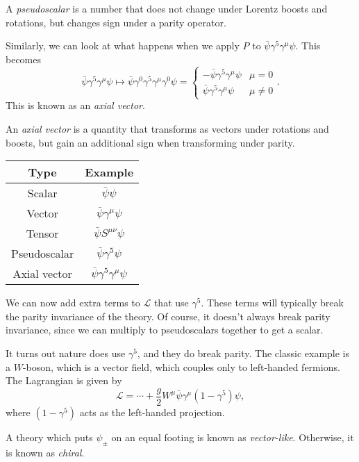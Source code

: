 \documentclass[a4paper]{article}
\begin{document}
\begin{defi}[Pseudoscalar]
  A \emph{pseudoscalar} is a number that does not change under Lorentz boosts and rotations, but changes sign under a parity operator.
\end{defi}
Similarly, we can look at what happens when we apply $P$ to $\bar \psi \gamma^5 \gamma^\mu \psi$. This becomes
\[
  \bar \psi \gamma^5 \gamma^\mu \psi \mapsto \bar\psi \gamma^0 \gamma^5 \gamma^\mu \gamma^0 \psi =
  \begin{cases}
    - \bar\psi \gamma^5 \gamma^\mu \psi & \mu = 0\\
    \bar\psi \gamma^5 \gamma^\mu \psi & \mu \not= 0
  \end{cases}.
\]
This is known as an \emph{axial vector}.
\begin{defi}
  An \emph{axial vector} is a quantity that transforms as vectors under rotations and boosts, but gain an additional sign when transforming under parity.
\end{defi}
\begin{center}
  \begin{tabular}{cc}
    \toprule
    Type & Example\\
    \midrule
    Scalar & $\bar\psi \psi$\\
    Vector & $\bar \psi \gamma^\mu \psi$\\
    Tensor & $\bar \psi S^{\mu\nu} \psi$\\
    Pseudoscalar & $\bar \psi \gamma^5 \psi$\\
    Axial vector & $\bar\psi \gamma^5 \gamma^\mu \psi$\\
    \bottomrule
  \end{tabular}
\end{center}
We can now add extra terms to $\mathcal{L}$ that use $\gamma^5$. These terms will typically break the parity invariance of the theory. Of course, it doesn't always break parity invariance, since we can multiply to pseudoscalars together to get a scalar.

It turns out nature does use $\gamma^5$, and they do break parity. The classic example is a $W$-boson, which is a vector field, which couples only to left-handed fermions. The Lagrangian is given by
\[
  \mathcal{L} = \cdots + \frac{g}{2} W^\mu \bar\psi \gamma^\mu(1 - \gamma^5) \psi,
\]
where $(1 - \gamma^5)$ acts as the left-handed projection.

A theory which puts $\psi_{\pm}$ on an equal footing is known as \emph{vector-like}. Otherwise, it is known as \emph{chiral}.
\end{document}
